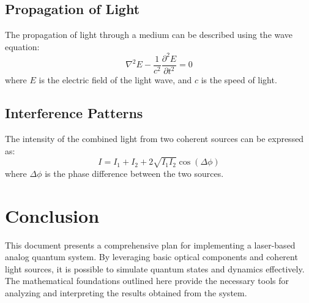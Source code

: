 \documentclass{article}
\begin{document}
\subsection{Propagation of Light}
The propagation of light through a medium can be described using the wave equation:
\[
\nabla^2 E - \frac{1}{c^2} \frac{\partial^2 E}{\partial t^2} = 0
\]
where \(E\) is the electric field of the light wave, and \(c\) is the speed of light.

\subsection{Interference Patterns}
The intensity of the combined light from two coherent sources can be expressed as:
\[
I = I_1 + I_2 + 2\sqrt{I_1 I_2} \cos(\Delta \phi)
\]
where \(\Delta \phi\) is the phase difference between the two sources.

\section{Conclusion}
This document presents a comprehensive plan for implementing a laser-based analog quantum system. By leveraging basic optical components and coherent light sources, it is possible to simulate quantum states and dynamics effectively. The mathematical foundations outlined here provide the necessary tools for analyzing and interpreting the results obtained from the system.
\end{document}
